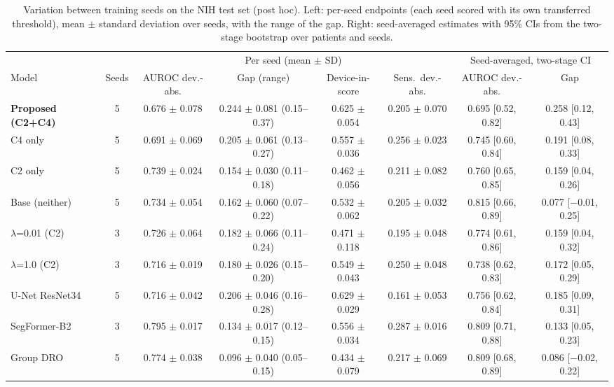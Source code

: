 \documentclass{ieeeaccess}
\newcommand{\ci}[2]{\scriptsize[#1, #2]}
\begin{document}
\begin{table}[!t]
\centering\footnotesize
\setlength{\tabcolsep}{2.5pt}
\caption{Variation between training seeds on the NIH test set (post hoc). Left: per-seed endpoints (each seed scored with its own transferred threshold), mean $\pm$ standard deviation over seeds, with the range of the gap. Right: seed-averaged estimates with 95\% CIs from the two-stage bootstrap over patients and seeds.}
\label{tab:seeds}
\begin{tabular}{@{}l c c c c c c c@{}}
\toprule
 & & \multicolumn{4}{c}{Per seed (mean $\pm$ SD)} & \multicolumn{2}{c}{Seed-averaged, two-stage CI} \\
\cmidrule(lr){3-6}\cmidrule(l){7-8}
Model & Seeds & AUROC dev.-abs. & Gap (range) & Device-in-score & Sens.\ dev.-abs. & AUROC dev.-abs. & Gap \\
\midrule
\rowcolor{band}\textbf{Proposed (C2+C4)} & 5 & 0.676 $\pm$ 0.078 & 0.244 $\pm$ 0.081 (0.15--0.37) & 0.625 $\pm$ 0.054 & 0.205 $\pm$ 0.070 & 0.695 \ci{0.52}{0.82} & 0.258 \ci{0.12}{0.43} \\
C4 only & 5 & 0.691 $\pm$ 0.069 & 0.205 $\pm$ 0.061 (0.13--0.27) & 0.557 $\pm$ 0.036 & 0.256 $\pm$ 0.023 & 0.745 \ci{0.60}{0.84} & 0.191 \ci{0.08}{0.33} \\
C2 only & 5 & 0.739 $\pm$ 0.024 & 0.154 $\pm$ 0.030 (0.11--0.18) & 0.462 $\pm$ 0.056 & 0.211 $\pm$ 0.082 & 0.760 \ci{0.65}{0.85} & 0.159 \ci{0.04}{0.26} \\
Base (neither) & 5 & 0.734 $\pm$ 0.054 & 0.162 $\pm$ 0.060 (0.07--0.22) & 0.532 $\pm$ 0.062 & 0.205 $\pm$ 0.032 & 0.815 \ci{0.66}{0.89} & 0.077 \ci{$-$0.01}{0.25} \\
$\lambda$=0.01 (C2) & 3 & 0.726 $\pm$ 0.064 & 0.182 $\pm$ 0.066 (0.11--0.24) & 0.471 $\pm$ 0.118 & 0.195 $\pm$ 0.048 & 0.774 \ci{0.61}{0.86} & 0.159 \ci{0.04}{0.32} \\
$\lambda$=1.0 (C2) & 3 & 0.716 $\pm$ 0.019 & 0.180 $\pm$ 0.026 (0.15--0.20) & 0.549 $\pm$ 0.043 & 0.250 $\pm$ 0.048 & 0.738 \ci{0.62}{0.83} & 0.172 \ci{0.05}{0.29} \\
\midrule
U-Net ResNet34 & 5 & 0.716 $\pm$ 0.042 & 0.206 $\pm$ 0.046 (0.16--0.28) & 0.629 $\pm$ 0.029 & 0.161 $\pm$ 0.053 & 0.756 \ci{0.62}{0.84} & 0.185 \ci{0.09}{0.31} \\
SegFormer-B2 & 3 & 0.795 $\pm$ 0.017 & 0.134 $\pm$ 0.017 (0.12--0.15) & 0.556 $\pm$ 0.034 & 0.287 $\pm$ 0.016 & 0.809 \ci{0.71}{0.88} & 0.133 \ci{0.05}{0.23} \\
Group DRO & 5 & 0.774 $\pm$ 0.038 & 0.096 $\pm$ 0.040 (0.05--0.15) & 0.434 $\pm$ 0.079 & 0.217 $\pm$ 0.069 & 0.809 \ci{0.68}{0.89} & 0.086 \ci{$-$0.02}{0.22} \\

\end{tabular}
\end{table}
\end{document}

